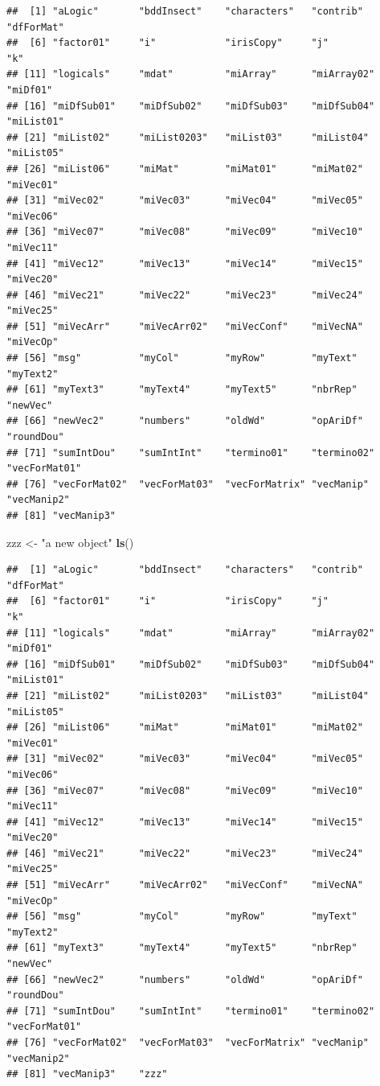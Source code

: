 \documentclass[
]{book}
\newenvironment{Shaded}{\begin{snugshade}}{\end{snugshade}}
\newcommand{\KeywordTok}[1]{\textcolor[rgb]{0.13,0.29,0.53}{\textbf{#1}}}
\newcommand{\NormalTok}[1]{#1}
\newcommand{\StringTok}[1]{\textcolor[rgb]{0.31,0.60,0.02}{#1}}
\begin{document}
\begin{verbatim}
##  [1] "aLogic"       "bddInsect"    "characters"   "contrib"      "dfForMat"    
##  [6] "factor01"     "i"            "irisCopy"     "j"            "k"           
## [11] "logicals"     "mdat"         "miArray"      "miArray02"    "miDf01"      
## [16] "miDfSub01"    "miDfSub02"    "miDfSub03"    "miDfSub04"    "miList01"    
## [21] "miList02"     "miList0203"   "miList03"     "miList04"     "miList05"    
## [26] "miList06"     "miMat"        "miMat01"      "miMat02"      "miVec01"     
## [31] "miVec02"      "miVec03"      "miVec04"      "miVec05"      "miVec06"     
## [36] "miVec07"      "miVec08"      "miVec09"      "miVec10"      "miVec11"     
## [41] "miVec12"      "miVec13"      "miVec14"      "miVec15"      "miVec20"     
## [46] "miVec21"      "miVec22"      "miVec23"      "miVec24"      "miVec25"     
## [51] "miVecArr"     "miVecArr02"   "miVecConf"    "miVecNA"      "miVecOp"     
## [56] "msg"          "myCol"        "myRow"        "myText"       "myText2"     
## [61] "myText3"      "myText4"      "myText5"      "nbrRep"       "newVec"      
## [66] "newVec2"      "numbers"      "oldWd"        "opAriDf"      "roundDou"    
## [71] "sumIntDou"    "sumIntInt"    "termino01"    "termino02"    "vecForMat01" 
## [76] "vecForMat02"  "vecForMat03"  "vecForMatrix" "vecManip"     "vecManip2"   
## [81] "vecManip3"
\end{verbatim}

\begin{Shaded}
\begin{Highlighting}[]
\NormalTok{zzz <-}\StringTok{ "a new object"}
\KeywordTok{ls}\NormalTok{()}
\end{Highlighting}
\end{Shaded}

\begin{verbatim}
##  [1] "aLogic"       "bddInsect"    "characters"   "contrib"      "dfForMat"    
##  [6] "factor01"     "i"            "irisCopy"     "j"            "k"           
## [11] "logicals"     "mdat"         "miArray"      "miArray02"    "miDf01"      
## [16] "miDfSub01"    "miDfSub02"    "miDfSub03"    "miDfSub04"    "miList01"    
## [21] "miList02"     "miList0203"   "miList03"     "miList04"     "miList05"    
## [26] "miList06"     "miMat"        "miMat01"      "miMat02"      "miVec01"     
## [31] "miVec02"      "miVec03"      "miVec04"      "miVec05"      "miVec06"     
## [36] "miVec07"      "miVec08"      "miVec09"      "miVec10"      "miVec11"     
## [41] "miVec12"      "miVec13"      "miVec14"      "miVec15"      "miVec20"     
## [46] "miVec21"      "miVec22"      "miVec23"      "miVec24"      "miVec25"     
## [51] "miVecArr"     "miVecArr02"   "miVecConf"    "miVecNA"      "miVecOp"     
## [56] "msg"          "myCol"        "myRow"        "myText"       "myText2"     
## [61] "myText3"      "myText4"      "myText5"      "nbrRep"       "newVec"      
## [66] "newVec2"      "numbers"      "oldWd"        "opAriDf"      "roundDou"    
## [71] "sumIntDou"    "sumIntInt"    "termino01"    "termino02"    "vecForMat01" 
## [76] "vecForMat02"  "vecForMat03"  "vecForMatrix" "vecManip"     "vecManip2"   
## [81] "vecManip3"    "zzz"
\end{verbatim}
\end{document}
